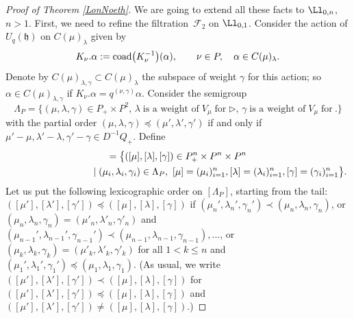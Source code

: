 \begin{proof}[Proof of Theorem \ref{LonNoeth}]
We are going to extend all these facts to $\Ll_{0,n}$, $n>1$. First, we need to refine the filtration~${\mathcal F}_2$ on $\Ll_{0,1}$. Consider the action of $U_q({\mathfrak h})$ on $C(\mu)_{\lambda}$ given by
\begin{equation}\label{coadweightnew}
K_\nu.\alpha := {\rm coad}\big(K_\nu^{-1}\big)(\alpha),\qquad \nu\in P, \quad \alpha \in C(\mu)_{\lambda}.
\end{equation}
Denote by $C(\mu)_{\lambda,\gamma} \subset C(\mu)_{\lambda}$ the subspace of weight $\gamma$ for
this action; so $\alpha \in C(\mu)_{\lambda,\gamma}$ if $K_\nu.\alpha= q^{(\nu,\gamma)}\alpha$.
Consider the semigroup
\[\Lambda_P=\{(\mu, \lambda,\gamma)\in P_+\times P^2, \, \lambda \;\text{is a weight of}\;V_\mu \;\text{for} \; \rhd ,\, \gamma \;\text{is a weight of}\;V_\mu \;\text{for}\ . \}\]
with the partial order $(\mu,\lambda,\gamma)\preceq (\mu', \lambda',\gamma')$ if and only if $\mu'-\mu,\lambda'-\lambda,\gamma'-\gamma\in D^{-1}Q_+$. Define
\begin{gather*}
[\Lambda_P] =\bigl\lbrace([\mu],[\lambda],[\gamma])\in P_+^n\times P^n\times P^n \\
\hphantom{[\Lambda_P] =\bigl\lbrace([\mu],[\lambda],[\gamma]}{} \mid (\mu_i,\lambda_i,\gamma_i)\in \Lambda_P,\ [\mu] = (\mu_i)_{i=1}^n, [\lambda] = (\lambda_i)_{i=1}^n, [\gamma]=(\gamma_i)_{i=1}^n\bigr\rbrace .
\end{gather*}
Let us put the following lexicographic order on $ [\Lambda_P]$, starting from the tail: $([\mu'],[\lambda'],[\gamma'])\preceq ([\mu], [\lambda],[\gamma])$ if $(\mu_n',\lambda_n',\gamma_n')\prec (\mu_n, \lambda_n,\gamma_n)$, or $(\mu_n,\lambda_n,\gamma_n)= (\mu'_n, \lambda'_n,\gamma'_n)$ and $(\mu_{n-1}',\lambda_{n-1}',\gamma_{n-1}')\prec (\mu_{n-1}, \lambda_{n-1},\gamma_{n-1}),\dots$, or $(\mu_k,\lambda_k,\gamma_k)= (\mu'_k, \lambda'_k,\gamma'_k)$ for all $1< k\leq n$ and $(\mu_1',\lambda_1',\gamma_1')\preceq (\mu_1, \lambda_1,\gamma_1)$. (As usual, we write $([\mu'],[\lambda'],[\gamma'])\prec ([\mu], [\lambda],[\gamma])$ for $([\mu'],[\lambda'],[\gamma'])\preceq ([\mu], [\lambda],[\gamma])$ and $([\mu'],[\lambda'],[\gamma'])\ne ([\mu], [\lambda],[\gamma])$.)


\end{proof}
